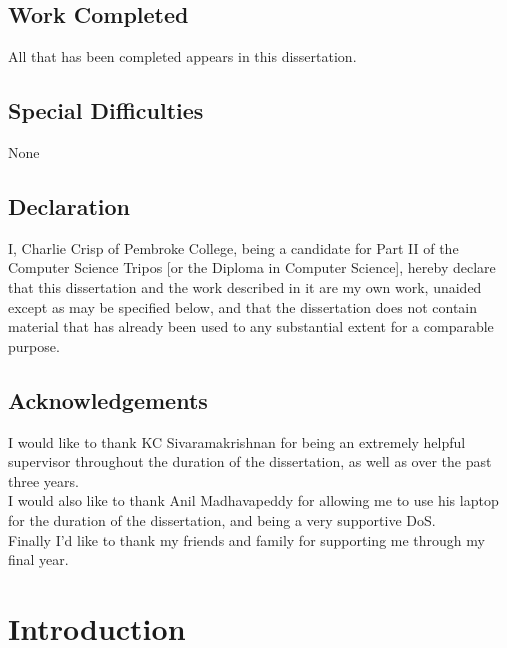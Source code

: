 \documentclass[12pt,a4paper,twoside,openright]{report}
\begin{document}
	
	\section*{Work Completed}
	
	All that has been completed appears in this dissertation.
	
	\section*{Special Difficulties}
	
	None
	 
	\newpage
	\section*{Declaration}
	
	I, Charlie Crisp of Pembroke College, being a candidate for Part II of the Computer
	Science Tripos [or the Diploma in Computer Science], hereby declare
	that this dissertation and the work described in it are my own work,
	unaided except as may be specified below, and that the dissertation
	does not contain material that has already been used to any substantial
	extent for a comparable purpose.
	
	\bigskip
	
	\medskip
	
	\tableofcontents
	
	\listoffigures
	
	\newpage
	\section*{Acknowledgements}
	
	I would like to thank KC Sivaramakrishnan for being an extremely helpful supervisor throughout the duration of the dissertation, as well as over the past three years.\\
	I would also like to thank Anil Madhavapeddy for allowing me to use his laptop for the duration of the dissertation, and being a very supportive DoS.\\
	Finally I'd like to thank my friends and family for supporting me through my final year.
	
	
	\pagestyle{headings}
	
	\chapter{Introduction}
	
\end{document}
